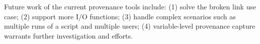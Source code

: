 \documentclass[a4paper]{llncs}
\begin{document}
Future work of the current provenance tools include: (1) solve the broken link use case; (2) support more I/O functions; (3) handle complex scenarios such as multiple runs of a script and multiple users; (4) variable-level provenance capture warrants further investigation and efforts.





%
%
%
%
%
%
%
%
%
%
%
%
%
%
%
%
%
%
%
\end{document}
